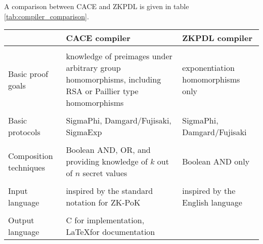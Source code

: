 A comparison between CACE and ZKPDL is given in table
\ref{tab:compiler_comparison}.

\begin{table}[hbt!]
  \begin{tabularx}{0.33\textwidth}{|l|l|l|}
    & CACE compiler & ZKPDL compiler \\
    \hline \\
    Basic proof goals &
    \begin{minipage}{0.33\textwidth}
      knowledge of preimages under arbitrary group homomorphisms,
      including RSA or Paillier type homomorphisms
    \end{minipage}
    &
    \begin{minipage}{0.33\textwidth}
      exponentiation homomorphisms only      
    \end{minipage} \\
    \hline \\
    Basic protocols &
    \begin{minipage}{0.33\linewidth}
      SigmaPhi, Damgard/Fujisaki, SigmaExp
    \end{minipage}
    &
    \begin{minipage}{0.33\linewidth}
      SigmaPhi, Damgard/Fujisaki
    \end{minipage} \\
    \hline \\
    Composition techniques &
    \begin{minipage}{0.33\linewidth}
      Boolean AND, OR, and providing knowledge
      of $k$ out of $n$ secret values
    \end{minipage}
    &
    \begin{minipage}{0.33\linewidth}
      Boolean AND only
    \end{minipage} \\
    \hline \\
    Input language &
    \begin{minipage}{0.33\linewidth}
      inspired by the standard notation for ZK-PoK
    \end{minipage}
    &
    \begin{minipage}{0.33\linewidth}
      inspired by the English language
    \end{minipage} \\
    \hline \\
    Output language &
    \begin{minipage}{0.33\linewidth}
      C for implementation, \LaTeX for documentation
    \end{minipage}

\end{tabularx}
\end{table}
